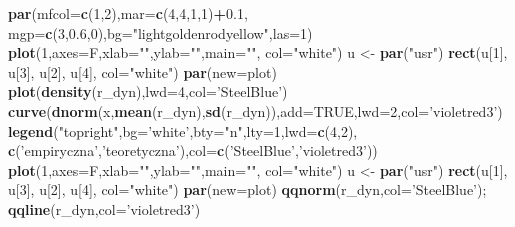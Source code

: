 \documentclass[polish,]{book}
\newenvironment{Shaded}{\begin{snugshade}}{\end{snugshade}}
\newcommand{\DataTypeTok}[1]{\textcolor[rgb]{0.13,0.29,0.53}{#1}}
\newcommand{\DecValTok}[1]{\textcolor[rgb]{0.00,0.00,0.81}{#1}}
\newcommand{\FloatTok}[1]{\textcolor[rgb]{0.00,0.00,0.81}{#1}}
\newcommand{\KeywordTok}[1]{\textcolor[rgb]{0.13,0.29,0.53}{\textbf{#1}}}
\newcommand{\NormalTok}[1]{#1}
\newcommand{\OperatorTok}[1]{\textcolor[rgb]{0.81,0.36,0.00}{\textbf{#1}}}
\newcommand{\OtherTok}[1]{\textcolor[rgb]{0.56,0.35,0.01}{#1}}
\newcommand{\StringTok}[1]{\textcolor[rgb]{0.31,0.60,0.02}{#1}}
\begin{document}
\begin{Shaded}
\begin{Highlighting}[]
\KeywordTok{par}\NormalTok{(}\DataTypeTok{mfcol=}\KeywordTok{c}\NormalTok{(}\DecValTok{1}\NormalTok{,}\DecValTok{2}\NormalTok{),}\DataTypeTok{mar=}\KeywordTok{c}\NormalTok{(}\DecValTok{4}\NormalTok{,}\DecValTok{4}\NormalTok{,}\DecValTok{1}\NormalTok{,}\DecValTok{1}\NormalTok{)}\OperatorTok{+}\FloatTok{0.1}\NormalTok{, }\DataTypeTok{mgp=}\KeywordTok{c}\NormalTok{(}\DecValTok{3}\NormalTok{,}\FloatTok{0.6}\NormalTok{,}\DecValTok{0}\NormalTok{),}\DataTypeTok{bg=}\StringTok{"lightgoldenrodyellow"}\NormalTok{,}\DataTypeTok{las=}\DecValTok{1}\NormalTok{)}
\KeywordTok{plot}\NormalTok{(}\DecValTok{1}\NormalTok{,}\DataTypeTok{axes=}\NormalTok{F,}\DataTypeTok{xlab=}\StringTok{""}\NormalTok{,}\DataTypeTok{ylab=}\StringTok{""}\NormalTok{,}\DataTypeTok{main=}\StringTok{""}\NormalTok{, }\DataTypeTok{col=}\StringTok{"white"}\NormalTok{)}
\NormalTok{u <-}\StringTok{ }\KeywordTok{par}\NormalTok{(}\StringTok{"usr"}\NormalTok{)}
\KeywordTok{rect}\NormalTok{(u[}\DecValTok{1}\NormalTok{], u[}\DecValTok{3}\NormalTok{], u[}\DecValTok{2}\NormalTok{], u[}\DecValTok{4}\NormalTok{], }\DataTypeTok{col=}\StringTok{"white"}\NormalTok{)}
\KeywordTok{par}\NormalTok{(}\DataTypeTok{new=}\NormalTok{plot)}
\KeywordTok{plot}\NormalTok{(}\KeywordTok{density}\NormalTok{(r_dyn),}\DataTypeTok{lwd=}\DecValTok{4}\NormalTok{,}\DataTypeTok{col=}\StringTok{'SteelBlue'}\NormalTok{)}
\KeywordTok{curve}\NormalTok{(}\KeywordTok{dnorm}\NormalTok{(x,}\KeywordTok{mean}\NormalTok{(r_dyn),}\KeywordTok{sd}\NormalTok{(r_dyn)),}\DataTypeTok{add=}\OtherTok{TRUE}\NormalTok{,}\DataTypeTok{lwd=}\DecValTok{2}\NormalTok{,}\DataTypeTok{col=}\StringTok{'violetred3'}\NormalTok{)}
\KeywordTok{legend}\NormalTok{(}\StringTok{"topright"}\NormalTok{,}\DataTypeTok{bg=}\StringTok{'white'}\NormalTok{,}\DataTypeTok{bty=}\StringTok{"n"}\NormalTok{,}\DataTypeTok{lty=}\DecValTok{1}\NormalTok{,}\DataTypeTok{lwd=}\KeywordTok{c}\NormalTok{(}\DecValTok{4}\NormalTok{,}\DecValTok{2}\NormalTok{),}
\KeywordTok{c}\NormalTok{(}\StringTok{'empiryczna'}\NormalTok{,}\StringTok{'teoretyczna'}\NormalTok{),}\DataTypeTok{col=}\KeywordTok{c}\NormalTok{(}\StringTok{'SteelBlue'}\NormalTok{,}\StringTok{'violetred3'}\NormalTok{))}
\KeywordTok{plot}\NormalTok{(}\DecValTok{1}\NormalTok{,}\DataTypeTok{axes=}\NormalTok{F,}\DataTypeTok{xlab=}\StringTok{""}\NormalTok{,}\DataTypeTok{ylab=}\StringTok{""}\NormalTok{,}\DataTypeTok{main=}\StringTok{""}\NormalTok{, }\DataTypeTok{col=}\StringTok{"white"}\NormalTok{)}
\NormalTok{u <-}\StringTok{ }\KeywordTok{par}\NormalTok{(}\StringTok{"usr"}\NormalTok{)}
\KeywordTok{rect}\NormalTok{(u[}\DecValTok{1}\NormalTok{], u[}\DecValTok{3}\NormalTok{], u[}\DecValTok{2}\NormalTok{], u[}\DecValTok{4}\NormalTok{], }\DataTypeTok{col=}\StringTok{"white"}\NormalTok{)}
\KeywordTok{par}\NormalTok{(}\DataTypeTok{new=}\NormalTok{plot)}
\KeywordTok{qqnorm}\NormalTok{(r_dyn,}\DataTypeTok{col=}\StringTok{'SteelBlue'}\NormalTok{); }\KeywordTok{qqline}\NormalTok{(r_dyn,}\DataTypeTok{col=}\StringTok{'violetred3'}\NormalTok{)}
\end{Highlighting}
\end{Shaded}
\end{document}
